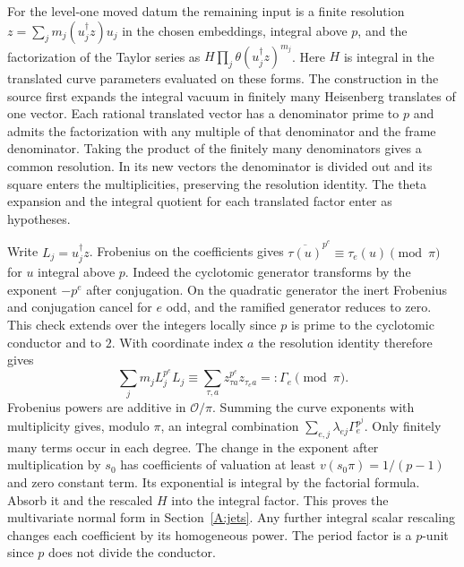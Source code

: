 For the level-one moved datum the remaining input is a finite resolution
$z=\sum_j m_j(u_j^\dagger z)u_j$ in the chosen embeddings, integral above $p$,
and the factorization of the Taylor series as
$H\prod_j\theta(u_j^\dagger z)^{m_j}$. Here $H$ is integral in the translated curve parameters evaluated on these forms.
The construction in the source first expands the integral vacuum in finitely many Heisenberg translates of one vector. Each rational translated vector has a denominator prime to $p$ and admits the factorization with any multiple of that denominator and the frame denominator. Taking the product of the finitely many denominators gives a common resolution. In its new vectors the denominator is divided out and its square enters the multiplicities, preserving the resolution identity. The theta expansion and the integral quotient for each translated factor enter as hypotheses.

Write $L_j=u_j^\dagger z$. Frobenius on the coefficients gives
$\overline{\tau(u)}^{p^e}\equiv\tau_e(u)\pmod\pi$ for $u$ integral above $p$.
Indeed the cyclotomic generator transforms by the exponent $-p^e$ after conjugation. On the quadratic generator the inert Frobenius and conjugation cancel for $e$ odd, and the ramified generator reduces to zero. This check extends over the integers locally since $p$ is prime to the cyclotomic conductor and to $2$. With coordinate index $a$ the resolution identity therefore gives
\[
 \sum_j m_j L_j^{p^e} L_j
 \equiv\sum_{\tau,a}z_{\tau a}^{p^e}z_{\tau_e a}
 =:\Gamma_e\pmod{\pi}.
\]
Frobenius powers are additive in $\mathcal O/\pi$. Summing the curve exponents with multiplicity gives, modulo $\pi$, an integral combination $\sum_{e,j}\lambda_{ej}\Gamma_e^{p^j}$. Only finitely many terms occur in each degree. The change in the exponent after multiplication by $s_0$ has coefficients of valuation at least $v(s_0\pi)=1/(p-1)$ and zero constant term. Its exponential is integral by the factorial formula. Absorb it and the rescaled $H$ into the integral factor. This proves the multivariate normal form in Section~\ref{A:jets}. Any further integral scalar rescaling changes each coefficient by its homogeneous power. The period factor is a $p$-unit since $p$ does not divide the conductor.

